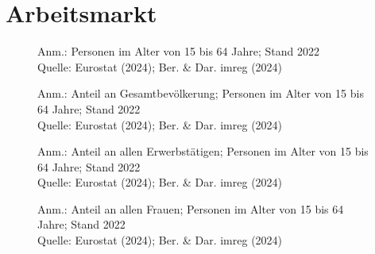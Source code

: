 
\section{Arbeitsmarkt}

\begin{figure}[p]
	{\centering {}}
	\label{map:erwerb}
	\begin{spacing}{1} \scriptsize
		Anm.: Personen im Alter von 15 bis 64 Jahre; Stand 2022\\
		Quelle: Eurostat (2024); Ber. \& Dar. imreg (2024) \end{spacing}
\end{figure}


\begin{figure}[p]
	{\centering {}}
	\label{map:erwerbquote}
	\begin{spacing}{1} \scriptsize
		Anm.: Anteil an Gesamtbevölkerung; Personen im Alter von 15 bis 64 Jahre; Stand 2022\\
		Quelle: Eurostat (2024); Ber. \& Dar. imreg (2024) \end{spacing}
\end{figure}


\begin{figure}[p]
	{\centering {}}
	\label{map:teilzeit}
	\begin{spacing}{1} \scriptsize
		Anm.: Anteil an allen Erwerbstätigen; Personen im Alter von 15 bis 64 Jahre; Stand 2022\\
		Quelle: Eurostat (2024); Ber. \& Dar. imreg (2024) \end{spacing}
\end{figure}


\begin{figure}[p]
	{\centering {}}
	\label{map:erwerbfrauen}
	\begin{spacing}{1} \scriptsize
		Anm.: Anteil an allen Frauen; Personen im Alter von 15 bis 64 Jahre; Stand 2022\\
		Quelle: Eurostat (2024); Ber. \& Dar. imreg (2024) \end{spacing}
\end{figure}


